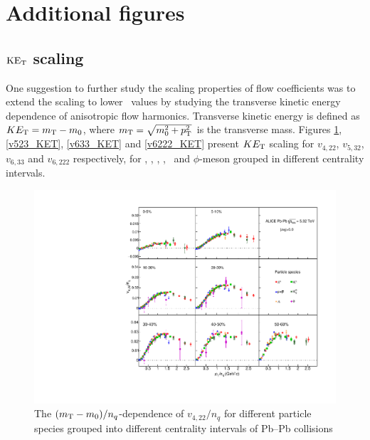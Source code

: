 \documentclass[ALICE,manyauthors]{cernphprep}
\providecommand{\DIFaddbeginFL}{} %
\providecommand{\DIFaddendFL}{} %
\providecommand{\DIFdelbeginFL}{} %
\providecommand{\DIFdelendFL}{} %
\begin{document}

\newpage
\appendix
\section{Additional figures}

\subsection{$\rm{KE_{T}}$ scaling}
\label{Subsubsection:KETscaling}

One suggestion to further study the scaling properties of flow coefficients was to extend the scaling to lower \pT~values by studying the transverse kinetic energy dependence of anisotropic flow harmonics. Transverse kinetic energy is defined as $KE_{\rm{T}} = m_{\rm{T}} - m_{\rm{0}}$, where $m_{\rm{T}}= \sqrt{m_{0}^2 + p_{\rm{T}}^2}$ is the transverse mass. Figures \ref{v422_KET}, \ref{v523_KET}, \ref{v633_KET} and \ref{v6222_KET} present $KE_{\rm{T}}$ scaling for $v_{4,22}$, $v_{5,32}$, $v_{6,33}$ and $v_{6,222}$ respectively, for \pion, \kaon, \proton, \Ks, \lambdas~and $\phi$-meson grouped in different centrality intervals.

\begin{figure}[htb]
\begin{center}
\DIFdelbeginFL %
\DIFdelendFL %
\DIFaddbeginFL \includegraphics[scale=0.82]{figures/scaling/All_v422_gap00_KET_3by3.pdf}

\DIFaddendFL \end{center}
\caption{The $(m_{\rm{T}} - m_{0})/n_{q}$-dependence of $v_{4,22}/n_{q}$ for different particle species grouped into different centrality intervals of Pb--Pb collisions \sNN}
\label{v422_KET}
\end{figure}
\end{document}
